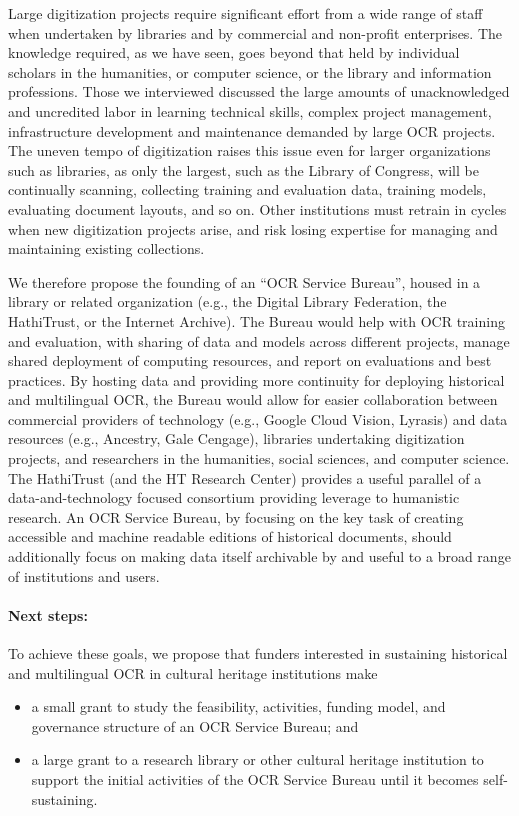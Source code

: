 \documentclass[twoside,11pt]{report}
\begin{document}
Large digitization projects require significant effort from a wide range of staff when undertaken by libraries and by commercial and non-profit enterprises. The knowledge required, as we have seen, goes beyond that held by individual scholars in the humanities, or computer science, or the library and information professions. Those we interviewed discussed the large amounts of unacknowledged and uncredited labor in learning technical skills, complex project management, infrastructure development and maintenance demanded by large OCR projects. The uneven tempo of digitization raises this issue even for larger organizations such as libraries, as only the largest, such as the Library of Congress, will be continually scanning, collecting training and evaluation data, training models, evaluating document layouts, and so on. Other institutions must retrain in cycles when new digitization projects arise, and risk losing expertise for managing and maintaining existing collections.

We therefore propose the founding of an ``OCR Service Bureau'', housed in a library or related organization (e.g., the Digital Library Federation, the HathiTrust, or the Internet Archive). The Bureau would help with OCR training and evaluation, with sharing of data and models across different projects, manage shared deployment of computing resources, and report on evaluations and best practices. By hosting data and providing more continuity for deploying historical and multilingual OCR, the Bureau would allow for easier collaboration between commercial providers of technology (e.g., Google Cloud Vision, Lyrasis) and data resources (e.g., Ancestry, Gale Cengage), libraries undertaking digitization projects, and researchers in the humanities, social sciences, and computer science. The HathiTrust (and the HT Research Center) provides a useful parallel of a data-and-technology focused consortium providing leverage to humanistic research. An OCR Service Bureau, by focusing on the key task of creating accessible and machine readable editions of historical documents, should additionally focus on making data itself archivable by and useful to a broad range of institutions and users.

\paragraph{Next steps:} To achieve these goals, we propose that funders interested in sustaining historical and multilingual OCR in cultural heritage institutions make
\begin{itemize}

\item a small grant to study the feasibility, activities, funding model, and governance structure of an OCR Service Bureau; and

\item a large grant to a research library or other cultural heritage institution to support the initial activities of the OCR Service Bureau until it becomes self-sustaining.

\end{itemize}
\end{document}
